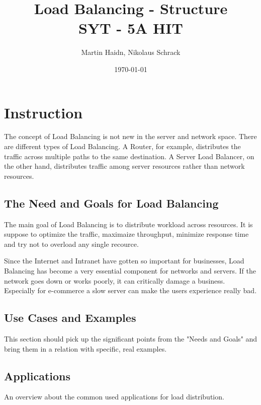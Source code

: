\documentclass[12p]{article}
\author{Martin Haidn, Nikolaus Schrack}
\title{Load Balancing - Structure\\SYT - 5A HIT}
\date{\today}
\begin{document}
	\maketitle
	
	\newpage
	\tableofcontents
	
	\newpage
	\section{Instruction}
	
	The concept of Load Balancing is not new in the server and network space. There are different types of Load Balancing. A Router, for example, distributes the traffic across multiple paths to the same destination. A Server Load Balancer, on the other hand, distributes traffic among server resources rather than network resources.
	
	
	
	\subsection{The Need and Goals for Load Balancing}
	 
	
	
	The main goal of Load Balancing is to distribute workload across resources. It is suppose to optimize the traffic, maximaize throughput, minimize response time and try not to overload any single recource. 
	
	Since the Internet and Intranet have gotten so important for businesses, Load Balancing has become a very essential component for networks and servers. If the network goes down or works poorly, it can critically damage a business. Especially for e-commerce a slow server can make the users experience really bad. 
	

	
	\subsection{Use Cases and Examples}
	This section should pick up the significant points from the "Needs and Goals" and bring them in a relation with specific, real examples.
	\subsection{Applications}
	An overview about the common used applications for load distribution.
	
\end{document}
